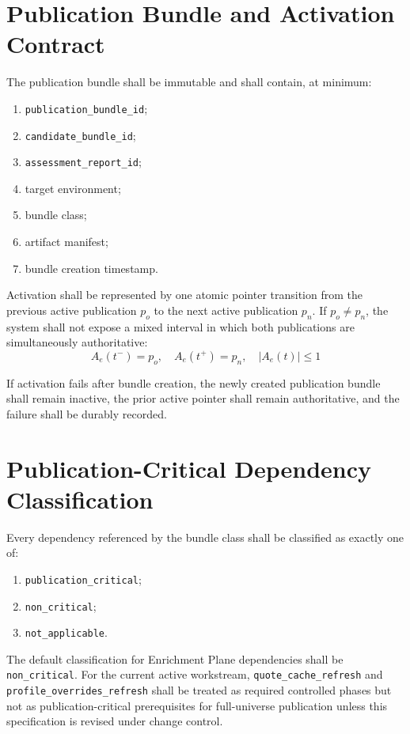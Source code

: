 \section{Publication Bundle and Activation Contract}
The publication bundle shall be immutable and shall contain, at minimum:
\begin{enumerate}[leftmargin=1.2cm]
    \item \texttt{publication\_bundle\_id};
    \item \texttt{candidate\_bundle\_id};
    \item \texttt{assessment\_report\_id};
    \item target environment;
    \item bundle class;
    \item artifact manifest;
    \item bundle creation timestamp.
\end{enumerate}

Activation shall be represented by one atomic pointer transition from the previous active publication \(p_o\) to the next active publication \(p_n\). If \(p_o \neq p_n\), the system shall not expose a mixed interval in which both publications are simultaneously authoritative:
\[
A_e(t^-) = p_o,\quad A_e(t^+) = p_n,\quad \left|A_e(t)\right| \le 1
\]

If activation fails after bundle creation, the newly created publication bundle shall remain inactive, the prior active pointer shall remain authoritative, and the failure shall be durably recorded.

\section{Publication-Critical Dependency Classification}
Every dependency referenced by the bundle class shall be classified as exactly one of:
\begin{enumerate}[leftmargin=1.2cm]
    \item \texttt{publication\_critical};
    \item \texttt{non\_critical};
    \item \texttt{not\_applicable}.
\end{enumerate}

The default classification for Enrichment Plane dependencies shall be \texttt{non\_critical}. For the current active workstream, \texttt{quote\_cache\_refresh} and \texttt{profile\_overrides\_refresh} shall be treated as required controlled phases but not as publication-critical prerequisites for full-universe publication unless this specification is revised under change control.

